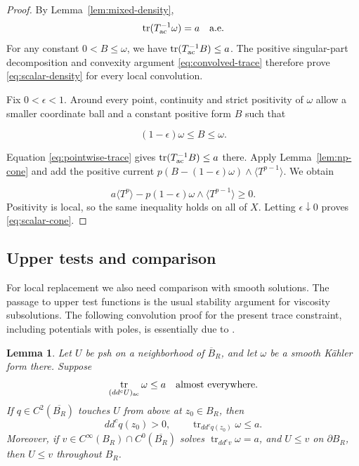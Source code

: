 \documentclass[reqno]{amsart}
\numberwithin{equation}{section}
\newtheorem{lemma}[theorem]{Lemma}
\theoremstyle{definition}
\DeclareMathOperator{\tr}{tr}
\newcommand{\ddc}{dd^c}
\begin{document}
\begin{proof}
By Lemma~\ref{lem:mixed-density}, 
\begin{equation}\label{eq:pointwise-trace}
\tr(T_{\rm ac}^{-1}\omega)= a\quad\text{a.e.}
\end{equation}
For any constant $0<B\leq\omega$, we have $\tr(T_{\rm ac}^{-1}B)\leq a$. The positive singular-part decomposition and convexity argument \eqref{eq:convolved-trace} therefore prove \eqref{eq:scalar-density} for every local convolution.

Fix $0<\epsilon<1$. Around every point, continuity and strict positivity of $\omega$ allow a smaller coordinate ball and a constant positive form $B$ such that

\[
(1-\epsilon)\omega\leq B\leq\omega.
\]

Equation \eqref{eq:pointwise-trace} gives $\tr(T_{\rm ac}^{-1}B)\leq a$ there. Apply Lemma~\ref{lem:np-cone} and add the positive current $p(B-(1-\epsilon)\omega)\wedge\langle T^{p-1}\rangle$. We obtain

\[
a\langle T^p\rangle-p(1-\epsilon)\omega\wedge\langle T^{p-1}\rangle\geq0.
\]
 Positivity is local, so the same inequality holds on all of $X$. Letting $\epsilon\downarrow0$ proves \eqref{eq:scalar-cone}. 
    
\end{proof}

\subsection{Upper tests and comparison}
For local replacement we also need comparison with smooth
solutions. The passage to upper test functions is the usual
stability argument for viscosity subsolutions.
 The following convolution proof for the present trace constraint,
including potentials with poles, is essentially due to \cite{M26b}.
\begin{lemma}\label{lem:upper-tests}
Let $U$ be psh on a neighborhood of $\overline B_R$, and let $\omega$ be a smooth K\"ahler form there. Suppose
\begin{equation}\label{eq:weak-trace}
\tr_{(dd^cU)_{\rm ac}}\omega\leq a
\quad\hbox{almost everywhere}.
\end{equation}
If $q\in C^2(\overline{B_R})$ touches $U$ from above at $z_0\in B_R$, then
\begin{equation}\label{eq:upper-test}
dd^cq(z_0)>0,\qquad
\tr_{dd^cq(z_0)}\omega\leq a. 
\end{equation}
Moreover, if $v\in C^\infty(B_R)\cap C^0(\overline{B_R})$ solves $\tr_{\ddc v}\omega=a$, and $U\leq v$ on $\partial B_R$, then $U\leq v$ throughout $B_R$. \end{lemma}
\end{document}
